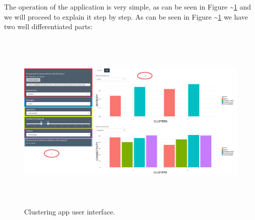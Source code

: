 \documentclass[
]{article}
\begin{document}
The operation of the application is very simple, as can be seen in
Figure \textasciitilde{}\ref{app1} and we will proceed to explain it
step by step. As can be seen in Figure \textasciitilde{}\ref{app1} we
have two well differentiated parts:

\begin{figure}
\centering
\includegraphics[width=\textwidth,height=3.4375in]{img/app1}
\caption{Clustering app user interface. \label{app1}}
\end{figure}
\end{document}
